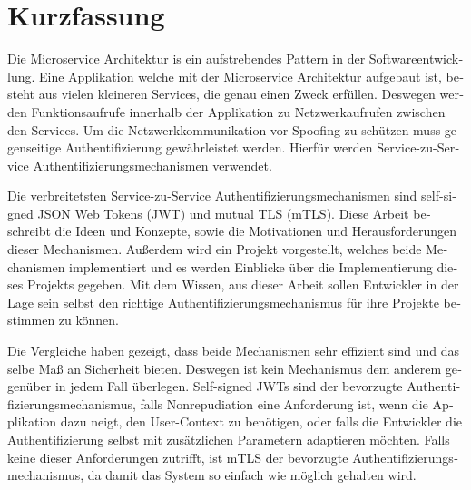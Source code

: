 \chapter{Kurzfassung}

\begin{german}
	Die Microservice Architektur is ein aufstrebendes Pattern in der Softwareentwicklung.
	Eine Applikation welche mit der Microservice Architektur aufgebaut ist, besteht aus vielen kleineren Services, die genau einen Zweck erfüllen.
	Deswegen werden Funktionsaufrufe innerhalb der Applikation zu Netzwerkaufrufen zwischen den Services.
	Um die Netzwerkkommunikation vor Spoofing zu schützen muss gegenseitige Authentifizierung gewährleistet werden.
	Hierfür werden Service-zu-Service Authentifizierungsmechanismen verwendet.

	Die verbreitetsten Service-zu-Service Authentifizierungsmechanismen sind self-signed JSON Web Tokens (JWT) und mutual TLS (mTLS).
	Diese Arbeit beschreibt die Ideen und Konzepte, sowie die Motivationen und Herausforderungen dieser Mechanismen.
	Außerdem wird ein Projekt vorgestellt, welches beide Mechanismen implementiert und es werden Einblicke über die Implementierung dieses Projekts gegeben.
	Mit dem Wissen, aus dieser Arbeit sollen Entwickler in der Lage sein selbst den richtige Authentifizierungsmechanismus für ihre Projekte bestimmen zu können.

	Die Vergleiche haben gezeigt, dass beide Mechanismen sehr effizient sind und das selbe Maß an Sicherheit bieten.
	Deswegen ist kein Mechanismus dem anderem gegenüber in jedem Fall überlegen.
	Self-signed JWTs sind der bevorzugte Authentifizierungsmechanismus, falls Nonrepudiation eine Anforderung ist, wenn die Applikation dazu neigt, den User-Context zu benötigen, oder falls die Entwickler die Authentifizierung selbst mit zusätzlichen Parametern adaptieren möchten.
	Falls keine dieser Anforderungen zutrifft, ist mTLS der bevorzugte Authentifizierungsmechanismus, da damit das System so einfach wie möglich gehalten wird.
\end{german}
